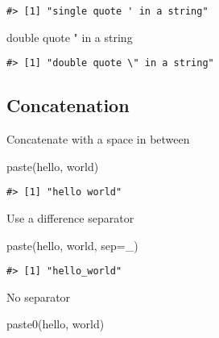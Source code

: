 \documentclass[
]{book}
\newenvironment{Shaded}{\begin{snugshade}}{\end{snugshade}}
\newcommand{\AttributeTok}[1]{\textcolor[rgb]{0.77,0.63,0.00}{#1}}
\newcommand{\FunctionTok}[1]{\textcolor[rgb]{0.00,0.00,0.00}{#1}}
\newcommand{\NormalTok}[1]{#1}
\newcommand{\StringTok}[1]{\textcolor[rgb]{0.31,0.60,0.02}{#1}}
\begin{document}
\begin{verbatim}
#> [1] "single quote ' in a string"
\end{verbatim}

\begin{Shaded}
\begin{Highlighting}[]
\StringTok{\textquotesingle{}double quote " in a string\textquotesingle{}}
\end{Highlighting}
\end{Shaded}

\begin{verbatim}
#> [1] "double quote \" in a string"
\end{verbatim}

\hypertarget{concatenation-1}{%
\subsection{Concatenation}\label{concatenation-1}}

Concatenate with a space in between

\begin{Shaded}
\begin{Highlighting}[]
\FunctionTok{paste}\NormalTok{(}\StringTok{\textquotesingle{}hello\textquotesingle{}}\NormalTok{, }\StringTok{\textquotesingle{}world\textquotesingle{}}\NormalTok{)}
\end{Highlighting}
\end{Shaded}

\begin{verbatim}
#> [1] "hello world"
\end{verbatim}

Use a difference separator

\begin{Shaded}
\begin{Highlighting}[]
\FunctionTok{paste}\NormalTok{(}\StringTok{\textquotesingle{}hello\textquotesingle{}}\NormalTok{, }\StringTok{\textquotesingle{}world\textquotesingle{}}\NormalTok{, }\AttributeTok{sep=}\StringTok{\textquotesingle{}\_\textquotesingle{}}\NormalTok{)}
\end{Highlighting}
\end{Shaded}

\begin{verbatim}
#> [1] "hello_world"
\end{verbatim}

No separator

\begin{Shaded}
\begin{Highlighting}[]
\FunctionTok{paste0}\NormalTok{(}\StringTok{\textquotesingle{}hello\textquotesingle{}}\NormalTok{, }\StringTok{\textquotesingle{}world\textquotesingle{}}\NormalTok{)}
\end{Highlighting}
\end{Shaded}
\end{document}
